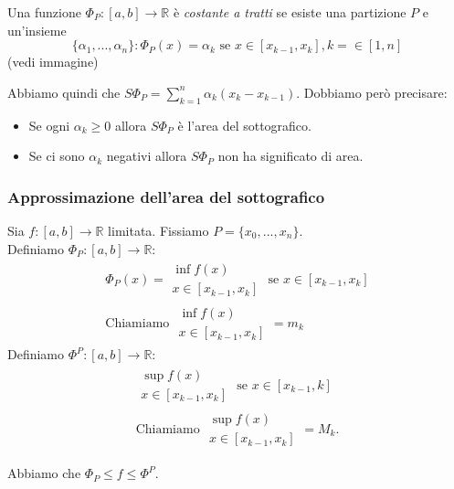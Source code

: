 \begin{definizione}[]
    Una funzione $\Phi_P:[a,b]\to \mathbb{R}$ è \textit{costante a tratti} se esiste una partizione $P$ e un'insieme
    \[
        \{\alpha_1,...,\alpha_n\}:\Phi_P(x)=\alpha_k \text{ se }x\in[x _{k-1},x_k], k=\in[1,n]
    \]
    (vedi immagine)
\end{definizione}
Abbiamo quindi che $S\Phi_P = \sum_{k=1}^{n}\alpha_k(x_k-x _{k-1})$. Dobbiamo però precisare:
\begin{itemize}
    \item Se ogni $\alpha_k\geq 0$ allora $S\Phi_P$ è l'area del sottografico.
    \item Se ci sono $\alpha_k$ negativi allora $S\Phi_P$ non ha significato di area.
\end{itemize}
\subsubsection{Approssimazione dell'area del sottografico}\label{sec:approssimazione_dell_area_del_sottografico}

Sia $f:[a,b]\to \mathbb{R}$ limitata. Fissiamo $P=\{x_0,...,x_n\}$. \\
Definiamo $\Phi_P:[a,b]\to \mathbb{R}:$
\begin{gather}
    \Phi_P(x)=\begin{matrix}
        \inf f(x) \\ x\in[x _{k-1},x_k]
    \end{matrix} \text{ se } x\in[x _{k-1}, x_k] \\
    \text{Chiamiamo }\begin{matrix}
        \inf f(x) \\ x\in[x _{k-1},x_k]
    \end{matrix} = m_k
\end{gather}
Definiamo $\Phi^P:[a,b]\to \mathbb{R}:$
\begin{gather}\begin{matrix}
        \sup f(x) \\ x\in[x _{k-1},x_k]
    \end{matrix}
    \text{ se } x\in[x _{k-1},k] \\
    \text{Chiamiamo }\begin{matrix}
        \sup f(x) \\ x\in[x _{k-1},x_k]
    \end{matrix}= M_k.
\end{gather}

\begin{osservazione}[]
    Abbiamo che $\Phi_P\leq f\leq \Phi^P$.
\end{osservazione}

